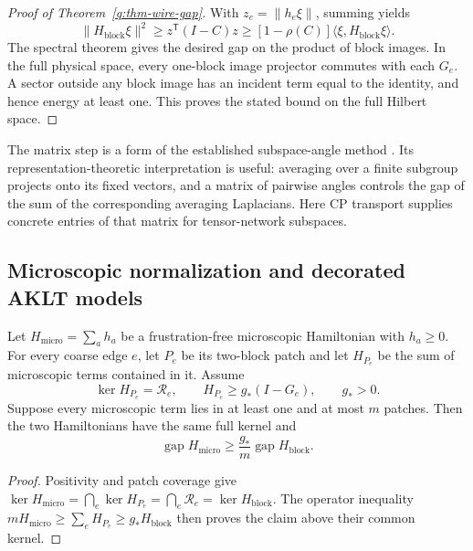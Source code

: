 \begin{proof}[Proof of Theorem~\ref{q:thm-wire-gap}]
With $z_e=\|h_e\xi\|$, summing yields
\[
 \|H_{\mathrm{block}}\xi\|^2
 \geq z^{\mathsf T}(I-C)z
 \geq[1-\rho(C)]\langle\xi,H_{\mathrm{block}}\xi\rangle.
\]
The spectral theorem gives the desired gap on the product of block
images.  In the full physical space, every one-block image projector
commutes with each $G_e$.  A sector outside any block image has an
incident term equal to the identity, and hence energy at least one.
This proves the stated bound on the full Hilbert space.
\end{proof}

The matrix step is a form of the established subspace-angle method
\cite{q:Kassabov2011}.  Its representation-theoretic interpretation is
useful: averaging over a finite subgroup projects onto its fixed vectors,
and a matrix of pairwise angles controls the gap of the sum of the
corresponding averaging Laplacians.  Here CP transport supplies concrete
entries of that matrix for tensor-network subspaces.

\subsection{Microscopic normalization and decorated AKLT models}

\begin{lemma}
\label{q:lem-seed}
Let $H_{\mathrm{micro}}=\sum_a h_a$ be a frustration-free microscopic
Hamiltonian with $h_a\geq0$.  For every coarse edge $e$, let $P_e$ be
its two-block patch and let $H_{P_e}$ be the sum of microscopic terms
contained in it.  Assume
\[
 \ker H_{P_e}=\mathcal R_e,\qquad
 H_{P_e}\geq g_* (I-G_e),\qquad g_*>0.
\]
Suppose every microscopic term lies in at least one and at most $m$
patches.  Then the two Hamiltonians have the same full kernel and
\begin{equation}
 \operatorname{gap}H_{\mathrm{micro}}
 \geq \frac{g_*}{m}\operatorname{gap}H_{\mathrm{block}}.
 \label{q:seed-comparison}
\end{equation}
\end{lemma}

\begin{proof}
Positivity and patch coverage give
$\ker H_{\mathrm{micro}}=\bigcap_e\ker H_{P_e}
=\bigcap_e\mathcal R_e=\ker H_{\mathrm{block}}$.
The operator inequality
$mH_{\mathrm{micro}}\geq\sum_eH_{P_e}\geq g_*H_{\mathrm{block}}$
then proves the claim above their common kernel.
\end{proof}

